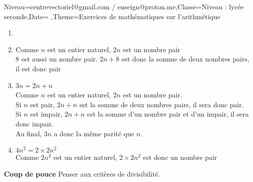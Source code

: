 \documentclass[a4paper,11pt,fleqn]{article}
\begin{document}
\begin{Maquette}[Fiche]{Niveau=centrevectoriel@gmail.com / enseign@proton.me,Classe=Niveau :  lycée seconde,Date=   ,Theme=Exercices de mathématiques  sur l'arithmétique }
\begin{Solution}\begin{multicols}{2}
\begin{enumerate}[itemsep=1em]
	\item \begin{minipage}[t]{\linewidth}  \end{minipage}
	\item \begin{minipage}[t]{\linewidth} Comme $n$ est un entier naturel, $2n$ est un nombre pair\\
                        8 est aussi un nombre pair.
                        $2n+8$ est donc la somme de deux nombres pairs, il est donc pair \end{minipage}
	\item \begin{minipage}[t]{\linewidth} 3$n=2n+n$\\
                            Comme $n$ est un entier naturel, $2 n$ est un nombre pair.\\
                            Si $n$ est pair, $2n+n$ est la somme de deux nombres pairs, il sera donc pair. \\
                            Si $n$ est impair, $2n+n$ est la somme d'un nombre pair et d'un impair, il sera donc impair. \\
                            Au final, 3$n$ a donc la même parité que $n$. \end{minipage}
	\item \begin{minipage}[t]{\linewidth} $4n^{2}=2\times 2n^{2}$\\
                        Comme $2n^{2}$ est un entier naturel, $2\times 2n^{2}$ est donc un nombre pair\\
                         \end{minipage}
\end{enumerate}
\end{multicols}
\end{Solution}

\begin{exercice}


    \begin{bclogo}[couleurBarre=nombres,couleurBord=nombres,epBord=2,couleur=gray!10,logo=\bclampe,arrondi=0.1]{\bf Coup de pouce}
      Penser aux critères de divisibilité.
    \end{bclogo}
    

\end{exercice}
\end{Maquette}
\end{document}
